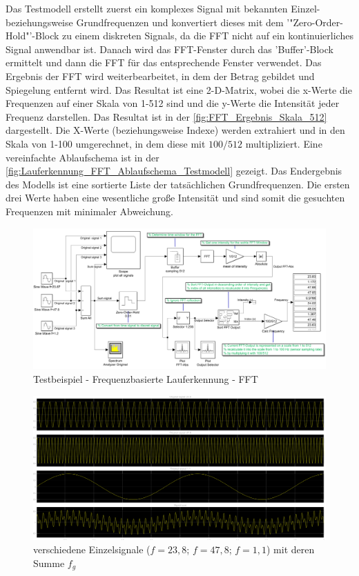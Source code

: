 Das Testmodell erstellt zuerst ein komplexes Signal mit bekannten Einzel- beziehungsweise Grundfrequenzen und konvertiert dieses mit dem '"Zero-Order-Hold"'-Block zu einem diskreten Signals, da die FFT nicht auf ein kontinuierliches Signal anwendbar ist. Danach wird das FFT-Fenster durch das 'Buffer'-Block ermittelt und dann die FFT für das entsprechende Fenster verwendet. Das Ergebnis der FFT wird weiterbearbeitet, in dem der Betrag gebildet und Spiegelung entfernt wird. Das Resultat ist eine 2-D-Matrix, wobei die x-Werte die Frequenzen auf einer Skala von 1-512 sind und die y-Werte die Intensität jeder Frequenz darstellen. Das Resultat ist in der \autoref{fig:FFT_Ergebnis_Skala_512} dargestellt. Die X-Werte (beziehungsweise Indexe) werden extrahiert und in den Skala von 1-100 umgerechnet, in dem diese mit $100/512$ multipliziert. Eine vereinfachte Ablaufschema ist in der \autoref{fig:Lauferkennung_FFT_Ablaufschema_Testmodell} gezeigt.
Das Endergebnis des Modells ist eine sortierte Liste der tatsächlichen Grundfrequenzen. Die ersten drei Werte haben eine wesentliche große Intensität und sind somit die gesuchten Frequenzen mit minimaler Abweichung.

\begin{landscape}
	\begin{figure}[H]
		\centering
		\includegraphics[width=\linewidth]{Bilder/Lauferkennung_FFT_Testmodell1.png}
		\caption{Testbeispiel - Frequenzbasierte Lauferkennung - FFT}
		\label{fig:Lauferkennung_Freqbasiert_FFT_Testmodell}
	\end{figure}
\end{landscape}

\begin{figure}[H] %
	\centering
	\includegraphics[width=\linewidth]{Bilder/Testsignal_AllViews.png}
	\caption{verschiedene Einzelsignale ($f=23,8$; $f=47,8$; $f=1,1$) mit deren Summe $f_g$}
	\label{fig:Testsignal_AllViews}
\end{figure}

